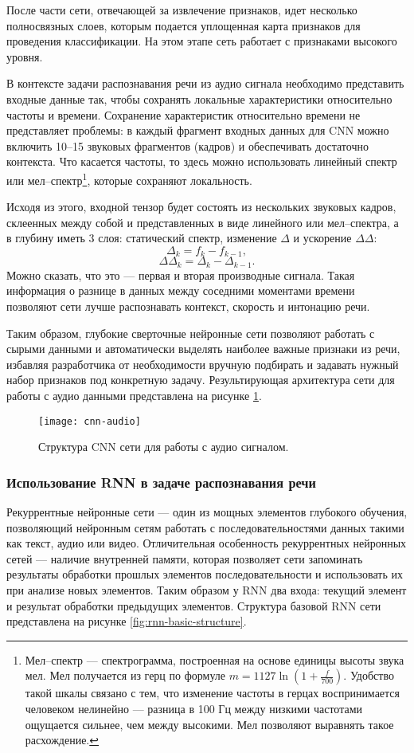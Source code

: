 После части сети, отвечающей за извлечение признаков, идет несколько полносвязных слоев, которым подается уплощенная карта признаков для проведения классификации. На этом этапе сеть работает с признаками высокого уровня.

В контексте задачи распознавания речи из аудио сигнала необходимо представить входные данные так, чтобы сохранять локальные характеристики относительно частоты и времени. Сохранение характеристик относительно времени не представляет проблемы: в каждый фрагмент входных данных для CNN можно включить 10--15 звуковых фрагментов (кадров) и обеспечивать достаточно контекста. Что касается частоты, то здесь можно использовать линейный спектр или мел--спектр\footnote{Мел--спектр --- спектрограмма, построенная на основе единицы высоты звука мел. Мел получается из герц по формуле $m = 1127 \ln \left(1 + \frac{f}{700}\right)$. Удобство такой шкалы связано с тем, что изменение частоты в герцах воспринимается человеком нелинейно --- разница в 100 Гц между низкими частотами ощущается сильнее, чем между высокими. Мел позволяют выравнять такое расхождение.}, которые сохраняют локальность.

Исходя из этого, входной тензор будет состоять из нескольких звуковых кадров, склеенных между собой и представленных в виде линейного или мел--спектра, а в глубину иметь 3 слоя: статический спектр, изменение $\Delta$ и ускорение $\Delta\Delta$:
$$\Delta_k = f_k - f_{k - 1},$$
$$\Delta\Delta_k = \Delta_k - \Delta_{k - 1}.$$
Можно сказать, что это --- первая и вторая производные сигнала. Такая информация о разнице в данных между соседними моментами времени позволяют сети лучше распознавать контекст, скорость и интонацию речи.

Таким образом, глубокие сверточные нейронные сети позволяют работать с сырыми данными и автоматически выделять наиболее важные признаки из речи, избавляя разработчика от необходимости вручную подбирать и задавать нужный набор признаков под конкретную задачу. Результирующая архитектура сети для работы с аудио данными представлена на рисунке \ref{fig:cnn-audio}.
\begin{figure}[h]
	\centering
	\texttt{[image: cnn-audio]}
	\caption{Структура CNN сети для работы с аудио сигналом.}
	\label{fig:cnn-audio}
\end{figure}

\subsubsection{Использование RNN в задаче распознавания речи}
Рекуррентные нейронные сети --- один из мощных элементов глубокого обучения, позволяющий нейронным сетям работать с последовательностями данных такими как текст, аудио или видео. Отличительная особенность рекуррентных нейронных сетей --- наличие внутренней памяти, которая позволяет сети запоминать результаты обработки прошлых элементов последовательности и использовать их при анализе новых элементов. Таким образом у RNN два входа: текущий элемент и результат обработки предыдущих элементов. Структура базовой RNN сети представлена на рисунке \ref{fig:rnn-basic-structure}.

